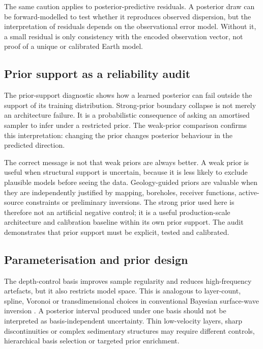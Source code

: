 \documentclass[referee]{gji}
\begin{document}
The same caution applies to posterior-predictive residuals. A posterior draw can be forward-modelled to test whether it reproduces observed dispersion, but the interpretation of residuals depends on the observational error model. Without it, a small residual is only consistency with the encoded observation vector, not proof of a unique or calibrated Earth model.

\subsection{Prior support as a reliability audit}

The prior-support diagnostic shows how a learned posterior can fail outside the support of its training distribution. Strong-prior boundary collapse is not merely an architecture failure. It is a probabilistic consequence of asking an amortised sampler to infer under a restricted prior. The weak-prior comparison confirms this interpretation: changing the prior changes posterior behaviour in the predicted direction.

The correct message is not that weak priors are always better. A weak prior is useful when structural support is uncertain, because it is less likely to exclude plausible models before seeing the data. Geology-guided priors are valuable when they are independently justified by mapping, boreholes, receiver functions, active-source constraints or preliminary inversions. The strong prior used here is therefore not an artificial negative control; it is a useful production-scale architecture and calibration baseline within its own prior support. The audit demonstrates that prior support must be explicit, tested and calibrated.

\subsection{Parameterisation and prior design}

The depth-control basis improves sample regularity and reduces high-frequency artefacts, but it also restricts model space. This is analogous to layer-count, spline, Voronoi or transdimensional choices in conventional Bayesian surface-wave inversion \citep{GaoLekic2018}. A posterior interval produced under one basis should not be interpreted as basis-independent uncertainty. Thin low-velocity layers, sharp discontinuities or complex sedimentary structures may require different controls, hierarchical basis selection or targeted prior enrichment.
\end{document}
